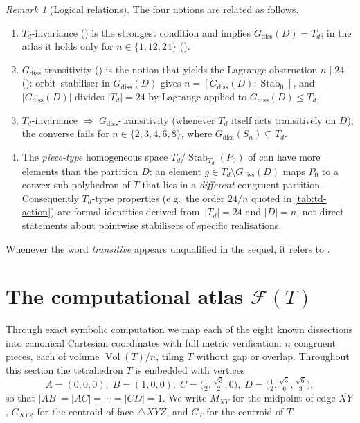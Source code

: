 \documentclass[11pt,a4paper]{article}
\theoremstyle{plain}
\theoremstyle{definition}
\theoremstyle{remark}
\newtheorem{remark}[remark]{Remark}
\DeclareMathOperator{\Stab}{Stab}
\DeclareMathOperator{\Vol}{Vol}
\newcommand{\Td}{T_{\!d}}
\newcommand{\calF}{\mathcal{F}}
\begin{document}
\begin{remark}[Logical relations]\label{rem:sym-relations}
The four notions are related as follows.
\begin{enumerate}
\item $\Td$-invariance () is the strongest
      condition and implies $G_{\mathrm{diss}}(D) = \Td$; in the atlas it
      holds only for $n \in \{1,12,24\}$ ().
\item $G_{\mathrm{diss}}$-transitivity () is the
      notion that yields the Lagrange obstruction $n \mid 24$
      (): orbit--stabiliser in $G_{\mathrm{diss}}(D)$ gives
      $n = [G_{\mathrm{diss}}(D) : \Stab_{0}]$, and
      $|G_{\mathrm{diss}}(D)|$ divides $|\Td| = 24$ by Lagrange applied to
      $G_{\mathrm{diss}}(D) \leq \Td$.
\item $\Td$-invariance $\Rightarrow$ $G_{\mathrm{diss}}$-transitivity
      (whenever $\Td$ itself acts transitively on $D$); the converse fails
      for $n \in \{2,3,4,6,8\}$, where $G_{\mathrm{diss}}(S_{n}) \subsetneq \Td$.
\item The \emph{piece-type} homogeneous space
      $\Td/\Stab_{\Td}(P_{0})$ of  can have more
      elements than the partition $D$: an element
      $g \in \Td \setminus G_{\mathrm{diss}}(D)$ maps $P_{0}$ to a convex
      sub-polyhedron of $T$ that lies in a \emph{different} congruent
      partition.  Consequently $\Td$-type properties (e.g.\ the order
      $24/n$ quoted in \cref{tab:td-action}) are formal identities derived
      from~$|\Td|=24$ and $|D|=n$, not direct statements about pointwise
      stabilisers of specific realisations.
\end{enumerate}
Whenever the word \emph{transitive} appears unqualified in the sequel, it
refers to .
\end{remark}

\section{The computational atlas \texorpdfstring{$\calF(T)$}{F(T)}}\label{sec:atlas}

Through exact symbolic computation we map each of the eight known dissections
into canonical Cartesian coordinates with full metric verification: $n$
congruent pieces, each of volume $\Vol(T)/n$, tiling $T$ without gap or
overlap.  Throughout this section the tetrahedron $T$ is embedded with
vertices
\begin{equation}\label{eq:atlas-coords}
A = (0,0,0),\; B = (1,0,0),\; C = \bigl(\tfrac12, \tfrac{\sqrt 3}{2}, 0\bigr),\;
D = \bigl(\tfrac12, \tfrac{\sqrt 3}{6}, \tfrac{\sqrt 6}{3}\bigr),
\end{equation}
so that $|AB| = |AC| = \cdots = |CD| = 1$. We write $M_{XY}$ for the midpoint
of edge $\overline{XY}$, $G_{XYZ}$ for the centroid of face $\triangle XYZ$,
and $G_T$ for the centroid of $T$.
\end{document}
